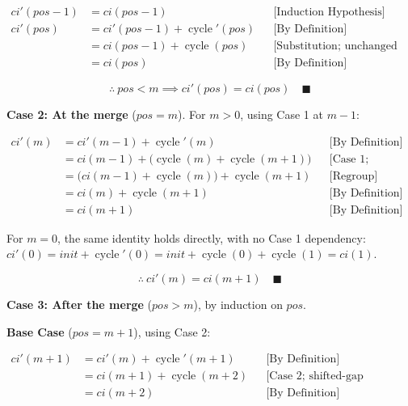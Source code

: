 \begin{equation*}
\begin{aligned}
ci'(pos - 1) &= ci(pos - 1)
  &&\text{[Induction Hypothesis]} \\
ci'(pos) &= ci'(pos - 1) + \operatorname{cycle}'(pos)
  &&\text{[By Definition]} \\
&= ci(pos - 1) + \operatorname{cycle}(pos)
  &&\text{[Substitution; unchanged gap before merge]} \\
&= ci(pos)
  &&\text{[By Definition]}
\end{aligned}
\end{equation*}

\begin{equation*}
\therefore \ pos < m \implies ci'(pos) = ci(pos) \quad \blacksquare
\end{equation*}

\textbf{Case 2: At the merge} ($pos = m$). For $m > 0$, using Case 1 at
$m - 1$:

\begin{equation*}
\begin{aligned}
ci'(m) &= ci'(m - 1) + \operatorname{cycle}'(m)
  &&\text{[By Definition]} \\
&= ci(m - 1) + \big(\operatorname{cycle}(m) + \operatorname{cycle}(m + 1)\big)
  &&\text{[Case 1; merged-gap definition]} \\
&= \big(ci(m - 1) + \operatorname{cycle}(m)\big) + \operatorname{cycle}(m + 1)
  &&\text{[Regroup]} \\
&= ci(m) + \operatorname{cycle}(m + 1)
  &&\text{[By Definition]} \\
&= ci(m + 1)
  &&\text{[By Definition]}
\end{aligned}
\end{equation*}

For $m = 0$, the same identity holds directly, with no Case 1 dependency:
$ci'(0) = init + \operatorname{cycle}'(0) = init + \operatorname{cycle}(0) + \operatorname{cycle}(1) = ci(1)$.

\begin{equation*}
\therefore \ ci'(m) = ci(m + 1) \quad \blacksquare
\end{equation*}

\textbf{Case 3: After the merge} ($pos > m$), by induction on $pos$.

\textbf{Base Case} ($pos = m + 1$), using Case 2:

\begin{equation*}
\begin{aligned}
ci'(m + 1) &= ci'(m) + \operatorname{cycle}'(m + 1)
  &&\text{[By Definition]} \\
&= ci(m + 1) + \operatorname{cycle}(m + 2)
  &&\text{[Case 2; shifted-gap definition]} \\
&= ci(m + 2)
  &&\text{[By Definition]}
\end{aligned}
\end{equation*}

